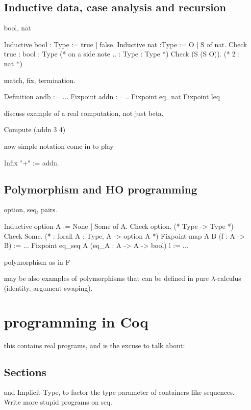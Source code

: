 \subsection{Inductive data, case analysis and recursion}
bool, nat

\begin{coq}{}
Inductive bool : Type := true | false.
Inductive nat :Type := O | S of nat.
Check true : bool : Type (* on a side note .. : Type : Type *)
Check (S (S O)). (* 2 : nat *)
\end{coq}

match, fix, termination.

\begin{coq}{}
Definition andb := ...
Fixpoint addn := ..
Fixpoint eq_nat
Fixpoint leq
\end{coq}

discuss example of a real computation, not just beta.

\begin{coq}{}
Compute (addn 3 4)
\end{coq}

now simple notation come in to play

\begin{coq}{}
Infix "+" := addn.
\end{coq}

\subsection{Polymorphism and HO programming}
option, seq, pairs.

\begin{coq}{}
Inductive option A := None | Some of A.
Check option. (* Type -> Type *)
Check Some. (* : forall A : Type, A -> option A *)
Fixpoint map A B (f : A -> B) := ...
Fixpoint eq_seq A (eq_A : A -> A -> bool) l := ...
\end{coq}

polymorphism as in F

may be also examples of polymorphisms that can be defined in pure
$\lambda$-calculus (identity, argument swaping).

\section{programming in Coq}
this contains real programs, and is the excuse to talk about:

\subsection{Sections}
and Implicit Type, to factor the type parameter of containers like
sequences.  Write more stupid programs on seq.

